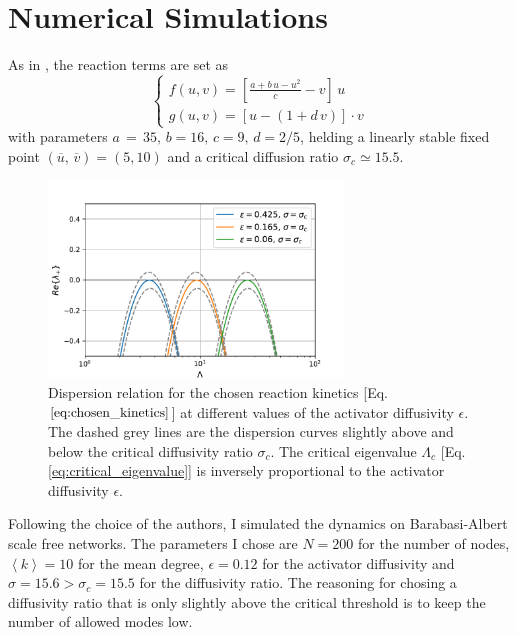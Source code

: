 \section{Numerical Simulations}
As in \cite{main_network}, the reaction terms are set as
\begin{equation}
    \begin{cases}
        f(u,v) = [\frac{a + b\,u -u^2}{c} - v]\, u \\
        g(u, v) = [u - (1+ d\,v)]\cdot v 
    \end{cases}
\label{eq:chosen_kinetics}
\end{equation}
with parameters $a\,=\,35,\, b=16,\, c= 9,\, d= 2/5$, 
helding a linearly stable fixed point $(\overline{u},\, \overline{v}) = (5, 10)$ and a critical diffusion ratio $\sigma_c \simeq 15.5$. \newline \noindent
\begin{figure}[H]
    \centering
    \includegraphics[width=0.7\textwidth]{latex_source/images/turing/multiple_dispersion.pdf}
    \caption{ Dispersion relation for the chosen reaction kinetics [Eq. $\ref{eq:chosen_kinetics}$] at different values of the activator diffusivity $\epsilon$. The dashed grey lines are the dispersion curves slightly above and below the critical diffusivity ratio $\sigma_c$. The critical eigenvalue $\Lambda_c$ [Eq. \ref{eq:critical_eigenvalue}] is inversely proportional to the activator diffusivity $\epsilon$.}
\end{figure}
\noindent Following the choice of the authors, I simulated the dynamics on Barabasi-Albert scale free networks. The parameters I chose are $N = 200$ for the number of nodes, $\left \langle k \right \rangle = 10$ for the mean degree,  $\epsilon = 0.12$ for the activator diffusivity and $\sigma = 15.6 > \sigma_c = 15.5$ for the diffusivity ratio. The reasoning for chosing a diffusivity ratio that is only slightly above the critical threshold is to keep the number of allowed modes low.

